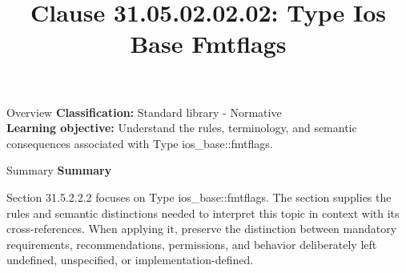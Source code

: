 \documentclass[10pt,letterpaper]{article}
\title{Clause 31.05.02.02.02: Type Ios Base Fmtflags}
\author{}
\date{}
\begin{document}
\maketitle
\begin{CornellOverviewBox}{Overview}
\textbf{Classification:} Standard library - Normative\\[2pt]
\textbf{Learning objective:} Understand the rules, terminology, and semantic consequences associated with Type ios\_base::fmtflags.
\end{CornellOverviewBox}\begin{CornellSummaryBox}{Summary}
{\sffamily\bfseries\color{Accent} Summary}\par\vspace{3pt}Section 31.5.2.2.2 focuses on Type ios\_base::fmtflags. The section supplies the rules and semantic distinctions needed to interpret this topic in context with its cross-references. When applying it, preserve the distinction between mandatory requirements, recommendations, permissions, and behavior deliberately left undefined, unspecified, or implementation-defined.
\end{CornellSummaryBox}
\end{document}
